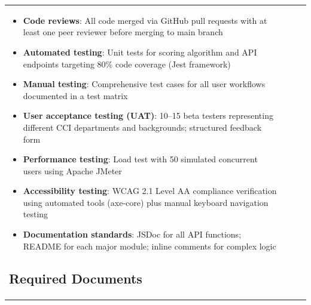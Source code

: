 \documentclass[12pt, a4paper]{article}
\begin{document}
\begin{itemize}[leftmargin=1.5em, itemsep=3pt]
\begin{table}[H]
\begin{tabularx}{\textwidth}{>{\raggedright\arraybackslash}p{0.8cm}>{\raggedright\arraybackslash}p{3.5cm}>{\raggedright\arraybackslash}X>{\raggedright\arraybackslash}p{2.5cm}}
\begin{itemize}[leftmargin=1.5em, itemsep=3pt]
    \item \textbf{Code reviews}: All code merged via GitHub pull requests with at least one peer reviewer before merging to main branch
    \item \textbf{Automated testing}: Unit tests for scoring algorithm and API endpoints targeting 80\% code coverage (Jest framework)
    \item \textbf{Manual testing}: Comprehensive test cases for all user workflows documented in a test matrix
    \item \textbf{User acceptance testing (UAT)}: 10--15 beta testers representing different CCI departments and backgrounds; structured feedback form
    \item \textbf{Performance testing}: Load test with 50 simulated concurrent users using Apache JMeter
    \item \textbf{Accessibility testing}: WCAG 2.1 Level AA compliance verification using automated tools (axe-core) plus manual keyboard navigation testing
    \item \textbf{Documentation standards}: JSDoc for all API functions; README for each major module; inline comments for complex logic
\end{itemize}

\subsection{Required Documents}


\end{tabularx}
\end{table}
\end{itemize}
\end{document}
